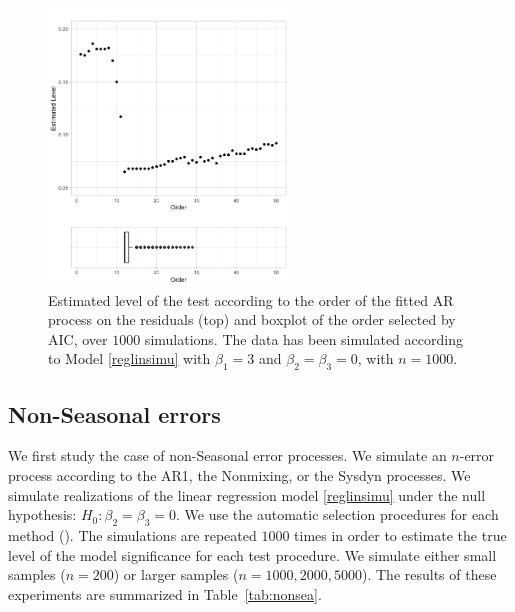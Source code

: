 \begin{figure}[h]
\begin{center}
\includegraphics[width=0.58\textwidth]{./figures/AR12_level_boxplot.png}
\caption{Estimated level of the test according to the order of the fitted AR process on the residuals (top) and boxplot of the order selected by AIC, over $1000$ simulations. The data has been simulated according to Model \eqref{reglinsimu} with $\beta_1 = 3$ and $\beta_{2} = \beta_{3} = 0$, with $n= 1000$.}
\label{levels}
\end{center}
\end{figure}

\subsection{Non-Seasonal errors}

We first study the case of non-Seasonal error processes. We simulate an $n$-error process according to the AR1, the Nonmixing, or the Sysdyn processes. We simulate realizations of  the linear regression model \eqref{reglinsimu} under the null hypothesis: $H_{0}: \beta_{2} = \beta_{3} = 0$. We use the automatic  selection procedures for each method ().  The simulations are repeated $1000$ times in order to estimate the true level of the model significance for each test procedure. We simulate either small samples ($n=200$) or larger samples ($n=1000, 2000, 5000$). The results of these experiments are summarized in Table~\ref{tab:nonsea}.

